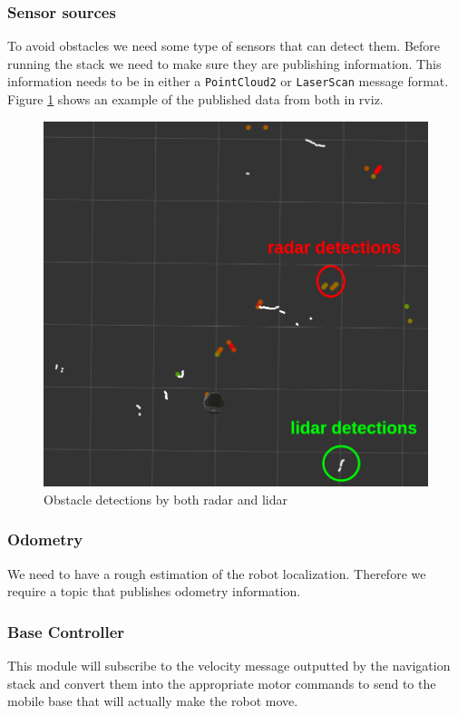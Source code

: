 \subsubsection{Sensor sources}
To avoid obstacles we need some type of sensors that can detect them. Before running the stack we need to make sure they are publishing information.
This information needs to be in either a  \texttt{PointCloud2} or \texttt{LaserScan} message format.
Figure \ref{fig:sensors} shows an example of the published data from both in rviz.
\begin{figure}[!htb]
    \centering
    \includegraphics[scale=0.4]{imgs/chapter3/sensors2.png}
    \caption{Obstacle detections by both radar and lidar}
    \label{fig:sensors}
\end{figure}
\subsubsection{Odometry}
We need to have a rough estimation of the robot localization. Therefore we require a topic that publishes odometry information.
\subsubsection{Base Controller}
This module will subscribe to the velocity message outputted by the navigation stack and convert them into the appropriate motor commands to send to the mobile base that will actually make the robot move.
